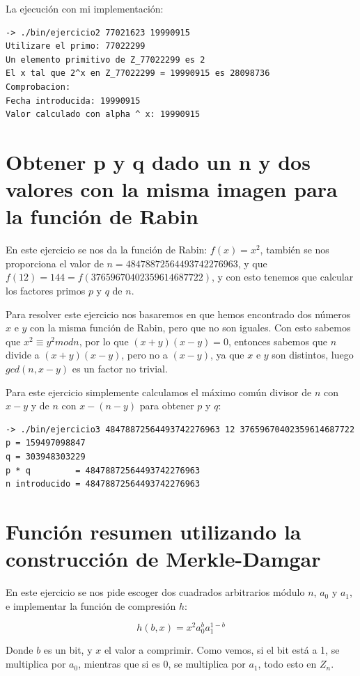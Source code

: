 \documentclass[12pt, spanish]{article}
\begin{document}
La ejecución con mi implementación:

\begin{lstlisting}
-> ./bin/ejercicio2 77021623 19990915
Utilizare el primo: 77022299
Un elemento primitivo de Z_77022299 es 2
El x tal que 2^x en Z_77022299 = 19990915 es 28098736
Comprobacion:
Fecha introducida: 19990915
Valor calculado con alpha ^ x: 19990915
\end{lstlisting}


\section{Obtener p y q dado un n y dos valores con la misma imagen para la función de Rabin}

En este ejercicio se nos da la función de Rabin: $f(x) = x^2$, también se nos proporciona el valor de $n = 48478872564493742276963$, y que $f (12) =144 = f (37659670402359614687722)$, y con esto tenemos que calcular los factores primos $p$ y $q$ de $n$.

Para resolver este ejercicio nos basaremos en que hemos encontrado dos números $x$ e $y$ con la misma función de Rabin, pero que no son iguales. Con esto sabemos que $x^2 \equiv y^2 mod n$, por lo que $(x + y)(x - y) = 0$, entonces sabemos que $n$ divide a $(x + y)(x - y)$, pero no a $(x - y)$, ya que $x$ e $y$ son distintos, luego $gcd(n, x - y)$ es un factor no trivial.

Para este ejercicio simplemente calculamos el máximo común divisor de $n$ con $x - y$ y de $n$ con $x - (n - y)$ para obtener $p$ y $q$:

\begin{lstlisting}
-> ./bin/ejercicio3 48478872564493742276963 12 37659670402359614687722
p = 159497098847
q = 303948303229
p * q         = 48478872564493742276963
n introducido = 48478872564493742276963
\end{lstlisting}


\section{Función resumen utilizando la construcción de Merkle-Damgar}

En este ejercicio se nos pide escoger dos cuadrados arbitrarios módulo $n$, $a_0$ y $a_1$, e implementar la función de compresión $h$:

$$
h(b,x) = x^2 a_0^b a_1^{1 - b}
$$

Donde $b$ es un bit, y $x$ el valor a comprimir. Como vemos, si el bit está a 1, se multiplica por $a_0$, mientras que si es 0, se multiplica por $a_1$, todo esto en $Z_n$.
\end{document}
